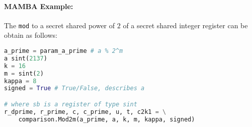 \iffalse
### NPS: This does not seem to be defined, or used
\msubsubsection{$\mathsf{Mod2m}(a_{prime}, \sshare{a},k,\sshare{m}, \kappa)$:}
This does the same operation as $\mathsf{Mod2m}$ above, but $m$ is now secret shared.
\begin{enumerate}
\item $\sshare{x_0},\ldots,\sshare{x_{k-1}}, \sshare{2^m} \asn \mathsf{B2U}(\sshare{m},k)$.
\item $\sshare{2^{-m}} \asn \mathsf{Inv}(\sshare{2^m})$.
\item $\sshare{r''}, \sshare{r}, \sshare{r}_B \asn \mathsf{PRandM}(k,k,\kappa)$.
\item $\sshare{r'} \asn \sum_{i=0}^{k-1} 2^i \cdot \sshare{x_i} \cdot \sshare{r_i}$
\item $c \asn \Open(\sshare{a}+\sshare{r''}+\sshare{r})$.
\item For $i \in [1,\ldots,k=1]$ do $c_i' \asn c \pmod{2^i}$.
\item $\sshare{c''} \asn \sum_{i=1}^{k-1} c_i' \cdot (\sshare{x_{i-1}}-\sshare{x_i})$.
\item $\sshare{d} \asn \mathsf{LT}(\sshare{c''},\sshare{r'},k)$.
\item $\sshare{b} \asn \sshare{c''}-\sshare{r'}+\sshare{2^m} \cdot \sshare{d}$.
\item Return $\sshare{b}$.
\end{enumerate}
\fi

\paragraph{MAMBA Example:} The \verb|mod| to a secret shared power of $2$ of a secret shared integer register can be obtain as follows: 
\begin{lstlisting}[language={python}]
a_prime = param_a_prime # a % 2^m
a sint(2137)
k = 16
m = sint(2)
kappa = 8  
signed = True # True/False, describes a

# where sb is a register of type sint
r_dprime, r_prime, c, c_prime, u, t, c2k1 = \
    comparison.Mod2m(a_prime, a, k, m, kappa, signed)
\end{lstlisting}


